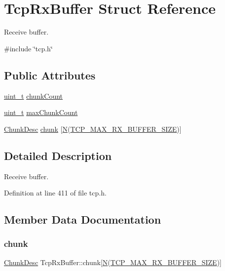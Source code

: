 \hypertarget{structTcpRxBuffer}{}\section{Tcp\+Rx\+Buffer Struct Reference}
\label{structTcpRxBuffer}


Receive buffer.  




{\ttfamily \#include \char`\"{}tcp.\+h\char`\"{}}

\subsection*{Public Attributes}
\begin{DoxyCompactItemize}
\item 
\hyperlink{compiler__port_8h_a12a1e9b3ce141648783a82445d02b58d}{uint\+\_\+t} \hyperlink{structTcpRxBuffer_a2b1ee76f3c6f430cfa5544673dd0085c}{chunk\+Count}
\item 
\hyperlink{compiler__port_8h_a12a1e9b3ce141648783a82445d02b58d}{uint\+\_\+t} \hyperlink{structTcpRxBuffer_a8d1adc51c070bd980aa98042c80af04e}{max\+Chunk\+Count}
\item 
\hyperlink{structChunkDesc}{Chunk\+Desc} \hyperlink{structTcpRxBuffer_ae2cbffb1e35522c23b0b9f4c2c5d584e}{chunk} \mbox{[}\hyperlink{net__mem_8h_a5d7f6248b8dd365190e7562d4e14a4f3}{N}(\hyperlink{tcp_8h_a220fffa3407e7ee49fdd8466c24d21b7}{T\+C\+P\+\_\+\+M\+A\+X\+\_\+\+R\+X\+\_\+\+B\+U\+F\+F\+E\+R\+\_\+\+S\+I\+ZE})\mbox{]}
\end{DoxyCompactItemize}


\subsection{Detailed Description}
Receive buffer. 

Definition at line 411 of file tcp.\+h.



\subsection{Member Data Documentation}
\mbox{\label{structTcpRxBuffer_ae2cbffb1e35522c23b0b9f4c2c5d584e}} 
\subsubsection{\texorpdfstring{chunk}{chunk}}
{\footnotesize\ttfamily \hyperlink{structChunkDesc}{Chunk\+Desc} Tcp\+Rx\+Buffer\+::chunk\mbox{[}\hyperlink{net__mem_8h_a5d7f6248b8dd365190e7562d4e14a4f3}{N}(\hyperlink{tcp_8h_a220fffa3407e7ee49fdd8466c24d21b7}{T\+C\+P\+\_\+\+M\+A\+X\+\_\+\+R\+X\+\_\+\+B\+U\+F\+F\+E\+R\+\_\+\+S\+I\+ZE})\mbox{]}}



